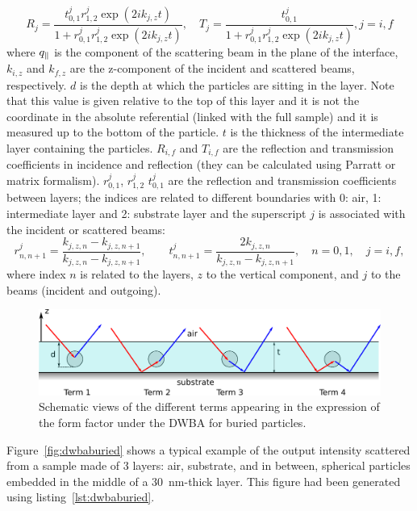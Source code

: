 \begin{equation*}
R_j =\frac{t^{j}_{0,1}r^{j}_{1,2}\exp(2ik_{j,z}t)}{1+r^{j}_{0,1}r^{j}_{1,2}\exp(2ik_{j,z}t)}, \quad T_j=\frac{t^{j}_{0,1}}{1+r^{j}_{0,1}r^{j}_{1,2}\exp(2ik_{j,z}t)}, j=i,f 
\end{equation*}
where $q_{\parallel}$ is the component of the scattering beam in the plane of the interface, $k_{i,z}$ and $k_{f,z}$ are the z-component of the incident and scattered beams, respectively.  $d$ is the depth at which the particles are sitting in the layer. Note that this value is given relative to the top of this layer and it is not the coordinate in the absolute referential (linked with the full sample) and it is measured up to the bottom of the particle. $t$ is the thickness of the intermediate layer containing the particles. $R_{i,f}$ and $T_{i,f}$  are the reflection  and transmission coefficients in incidence and reflection (they can be calculated using Parratt or matrix formalism). $r^j_{0,1}$, $r^j_{1,2}$ $t^j_{0,1}$ are the reflection and transmission coefficients between layers; the indices are related to different boundaries with 0: air, 1: intermediate layer and 2: substrate layer and the superscript $j$ is associated with the incident or scattered beams:
\begin{equation*}
r^j_{n,n+1}=\frac{k_{j,z,n}-k_{j,z,n+1}}{k_{j,z,n}-k_{j,z,n+1}}, \qquad t^j_{n,n+1}= \frac{2k_{j,z,n}}{k_{j,z,n}-k_{j,z,n+1}}, \quad n=0,1, \quad j=i,f,
\end{equation*}
where index $n$ is related to the layers, $z$ to the vertical component, and $j$ to the beams (incident and outgoing).

\begin{figure}[tb]
\begin{center}
\includegraphics[width=\textwidth]{fig/drawing/drawingDWBAburied.pdf}
\end{center}
\caption{Schematic views of the different terms appearing in the expression of the form factor under the DWBA for buried particles.}
\label{fig:SchemDWBAburied}
\end{figure}


Figure~\ref{fig:dwbaburied} shows a typical example of the output intensity scattered from a sample made of 3 layers: air, substrate, and in between, spherical particles embedded in the middle of a 30~nm-thick layer. This figure had been generated using listing~\ref{lst:dwbaburied}.

